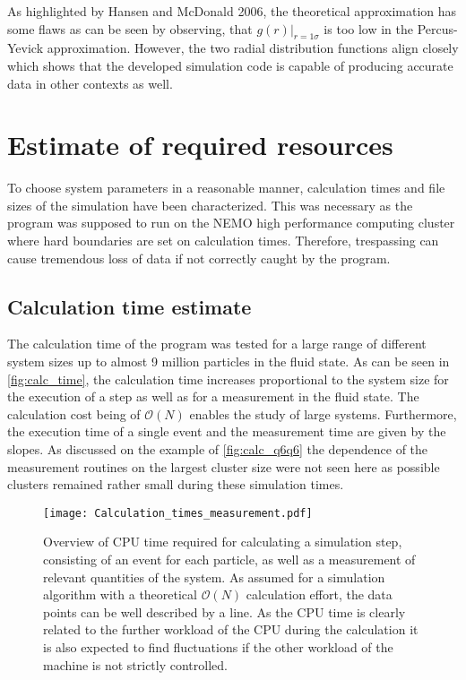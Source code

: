 As highlighted by Hansen and McDonald 2006\cite{Hansen2006}, the theoretical approximation has some flaws as can be seen by observing, that $g(r)|_{r=1\sigma}$ is too low in the Percus-Yevick approximation. However, the two radial distribution functions align closely which shows that the developed simulation code is capable of producing accurate data in other contexts as well.

\section{Estimate of required resources}
\label{sec:resources}
To choose system parameters in a reasonable manner, calculation times and file sizes of the simulation have been characterized. This was necessary as the program was supposed to run on the NEMO high performance computing cluster where hard boundaries are set on calculation times. Therefore, trespassing can cause tremendous loss of data if not correctly caught by the program.
 
\subsection{Calculation time estimate}
\label{sec:calc_times}
The calculation time of the program was tested for a large range of different system sizes up to almost 9 million particles in the fluid state. As can be seen in \autoref{fig:calc_time}, the calculation time increases proportional to the system size for the execution of a step as well as for a measurement in the fluid state. The calculation cost being of $\mathcal{O}(N)$ enables the study of large systems. Furthermore, the execution time of a single event and the measurement time are given by the slopes. As discussed on the example of \autoref{fig:calc_q6q6} the dependence of the measurement routines on the largest cluster size were not seen here as possible clusters remained rather small during these simulation times.

\begin{figure}[h!]
\centering
\texttt{[image: Calculation\_times\_measurement.pdf]}
\caption[Calculation time estimate of the simulation]{Overview of CPU time required for calculating a simulation step, consisting of an event for each particle, as well as a measurement of relevant quantities of the system. As assumed for a simulation algorithm with a theoretical $\mathcal{O}(N)$ calculation effort, the data points can be well described by a line. As the CPU time is clearly related to the further workload of the CPU during the calculation it is also expected to find fluctuations if the other workload of the machine is not strictly controlled.}
\label{fig:calc_time}
\end{figure}


